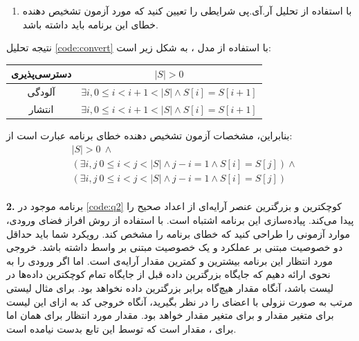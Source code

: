 \documentclass{article}
\newenvironment{answer}{}{\\[.3ex]}
\newenvironment{question}[1]{\textbf{#1.} }{}
\newenvironment{qitem}[1]{%
	\begin{enumerate}\item[(#1)]}{\end{enumerate}}
\begin{document}
\begin{qitem}{e}
با استفاده از تحلیل آر.آی.پی شرایطی را تعیین کنید که مورد آزمون تشخیص دهنده خطای این برنامه باید داشته باشد.
\end{qitem}
\begin{answer}
نتیجه تحلیل \autoref{code:convert} با استفاده از مدل ، به شکل زیر است:

\begin{table}[h]
	\centering
\begin{tabular}{c|c}
	دسترسی‌پذیری & $|S| > 0$\\\hline
	آلودگی & $\exists i, 0 \leq i < i + 1 < |S| \wedge S[i]=S[i+1]$\\\hline
	انتشار &
	$\exists i, 0 \leq i < i + 1 < |S| \wedge S[i]=S[i+1]$
\end{tabular}
\end{table}
بنابراین، مشخصات آزمون تشخیص دهنده خطای برنامه عبارت است از:
\begin{align*}
	&|S| > 0\ \wedge\\
	&\left(\exists i, j\ 0 \leq i < j < |S| \wedge j - i = 1 \wedge S[i]=S[j]\right) \wedge\\
	&\left(\exists i, j\ 0 \leq i < j < |S| \wedge j - i = 1 \wedge S[i]=S[j]\right)
\end{align*}
\end{answer}
\begin{question}{2}
برنامه موجود در \autoref{code:q2} کوچکترین و بزرگترین عنصر آرایه‌ای از اعداد صحیح را پیدا می‌کند. پیاده‌سازی این برنامه اشتباه است. با استفاده از روش افراز فضای ورودی، موارد آزمونی را طراحی کنید که خطای برنامه را مشخص کند. رویکرد شما باید حداقل دو خصوصیت مبتنی بر عملکرد و یک خصوصیت مبتنی بر واسط داشته باشد.
\end{question}
خروجی مورد انتظار این برنامه بیشترین و کمترین مقدار آرایه‌ی  است. اما اگر ورودی را به نحوی ارائه دهیم که جایگاه بزرگترین داده قبل از جایگاه تمام کوچکترین داده‌ها در لیست باشد، آنگاه مقدار  هیچ‌گاه برابر بزرگترین داده نخواهد بود.
برای مثال لیستی مرتب به صورت نزولی با اعضای \code{\lr{[4, 3, 2, 1]}}
را در نظر بگیرید، آنگاه خروجی کد به ازای این لیست برای متغیر  مقدار  و برای متغیر  مقدار  خواهد بود.
مقدار مورد انتظار برای  همان  اما برای ، مقدار  است که توسط این تابع بدست نیامده است.
\end{document}
